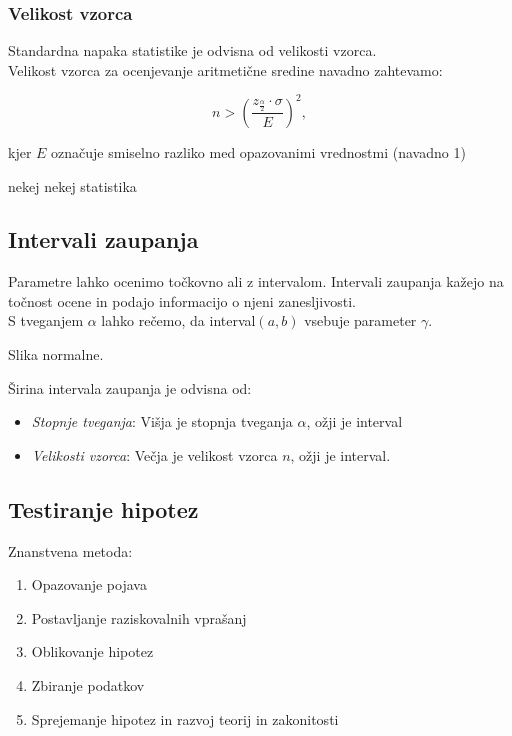 \subsubsection*{Velikost vzorca}

Standardna napaka statistike je odvisna od velikosti vzorca.\\

Velikost vzorca za ocenjevanje aritmetične sredine navadno zahtevamo:

\[n>\left(\frac{z_{\frac{\alpha}{2}}\cdot\sigma}{E}\right)^2,\]

kjer $E$ označuje smiselno razliko med opazovanimi vrednostmi (navadno 1)

nekej nekej statistika

\subsection*{Intervali zaupanja}

Parametre lahko ocenimo točkovno ali z intervalom. Intervali zaupanja kažejo na točnost ocene in podajo informacijo o njeni zanesljivosti.\\
S tveganjem $\alpha$ lahko rečemo, da interval$(a,b)$ vsebuje parameter $\gamma$.

Slika normalne.

Širina intervala zaupanja je odvisna od:
\begin{itemize}
    \item \textit{Stopnje tveganja}: Višja je stopnja tveganja $\alpha$, ožji je interval
    \item \textit{Velikosti vzorca}: Večja je velikost vzorca $n$, ožji je interval.
\end{itemize}

\subsection*{Testiranje hipotez}

Znanstvena metoda:
\begin{enumerate}
    \item Opazovanje pojava
    \item Postavljanje raziskovalnih vprašanj
    \item Oblikovanje hipotez
    \item Zbiranje podatkov
    \item Sprejemanje hipotez in razvoj teorij in zakonitosti
\end{enumerate}

